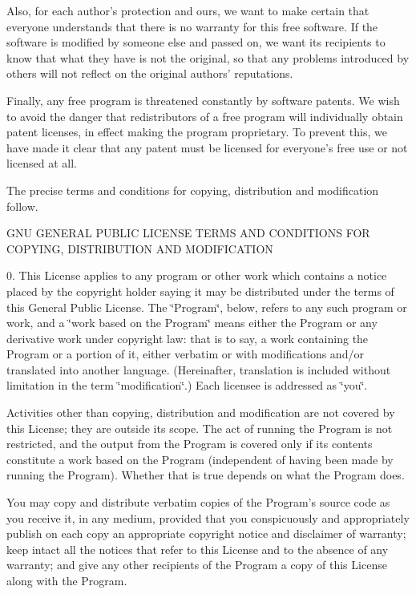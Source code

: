 Also, for each author's protection and ours, we want to make certain that everyone understands that there is no warranty for this free software. If the software is modified by someone else and passed on, we want its recipients to know that what they have is not the original, so that any problems introduced by others will not reflect on the original authors' reputations.

Finally, any free program is threatened constantly by software patents. We wish to avoid the danger that redistributors of a free program will individually obtain patent licenses, in effect making the program proprietary. To prevent this, we have made it clear that any patent must be licensed for everyone's free use or not licensed at all.

The precise terms and conditions for copying, distribution and modification follow.

G\-N\-U G\-E\-N\-E\-R\-A\-L P\-U\-B\-L\-I\-C L\-I\-C\-E\-N\-S\-E T\-E\-R\-M\-S A\-N\-D C\-O\-N\-D\-I\-T\-I\-O\-N\-S F\-O\-R C\-O\-P\-Y\-I\-N\-G, D\-I\-S\-T\-R\-I\-B\-U\-T\-I\-O\-N A\-N\-D M\-O\-D\-I\-F\-I\-C\-A\-T\-I\-O\-N

0. This License applies to any program or other work which contains a notice placed by the copyright holder saying it may be distributed under the terms of this General Public License. The \char`\"{}\-Program\char`\"{}, below, refers to any such program or work, and a \char`\"{}work based on the Program\char`\"{} means either the Program or any derivative work under copyright law\-: that is to say, a work containing the Program or a portion of it, either verbatim or with modifications and/or translated into another language. (Hereinafter, translation is included without limitation in the term \char`\"{}modification\char`\"{}.) Each licensee is addressed as \char`\"{}you\char`\"{}.

Activities other than copying, distribution and modification are not covered by this License; they are outside its scope. The act of running the Program is not restricted, and the output from the Program is covered only if its contents constitute a work based on the Program (independent of having been made by running the Program). Whether that is true depends on what the Program does.
\begin{DoxyEnumerate}
\item You may copy and distribute verbatim copies of the Program's source code as you receive it, in any medium, provided that you conspicuously and appropriately publish on each copy an appropriate copyright notice and disclaimer of warranty; keep intact all the notices that refer to this License and to the absence of any warranty; and give any other recipients of the Program a copy of this License along with the Program.
\end{DoxyEnumerate}

